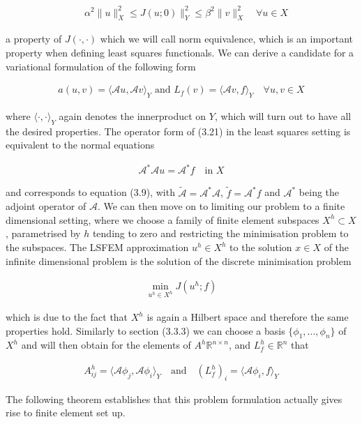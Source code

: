 \documentclass[../draft_1.tex]{subfiles}
\begin{document}
\begin{ceqn}
	\begin{align}
	\quad \alpha^2 \| u \|_X^2 \leq J(u; 0)  \|_Y^2 \leq \beta^2 \| v \|_X^2 \quad \forall u \in X
	\end{align} 
\end{ceqn}
a property of $J(\cdot, \cdot)$ which we will call norm equivalence, which is an important property when defining least squares functionals. We can derive a candidate for a variational formulation of the following form 
\begin{ceqn}
\begin{align}
\label{lsfem_bilinear_form}
a(u,v) = \langle \mathcal{A}u, \mathcal{A}v \rangle_Y \text{ and } L_f(v) = \langle \mathcal{A}v, f \rangle_Y \quad \forall u,v \in X
\end{align}
\end{ceqn}
where $\langle \cdot, \cdot \rangle_Y$ again denotes the innerproduct on $Y$, which will turn out to have all the desired properties. The operator form of (3.21) in the least squares setting is equivalent to the normal equations
\begin{ceqn}
\begin{align}
\mathcal{A}^* \mathcal{A} u = \mathcal{A}^* f \quad \text{in } X
\end{align}
\end{ceqn}
and corresponds to equation (3.9), with $\tilde{\mathcal{A}} = \mathcal{A}^* \mathcal{A}$, $\tilde{f} = \mathcal{A}^* f $ and $\mathcal{A}^*$ being the adjoint operator of $\mathcal{A}$. We can then move on to limiting our problem to a finite dimensional setting, where we choose a family of finite element subspaces $X^h \subset X$, parametrised by $h$ tending to zero and restricting the minimisation problem to the subspaces. The LSFEM approximation $u^h \in X^h$ to the solution $x \in X$ of the infinite dimensional problem is the solution of the discrete minimisation problem 
\begin{ceqn}
\begin{align}
\min_{u^h \in X^h} J(u^h; f)
\end{align}
\end{ceqn}
which is due to the fact that $X^h$ is again a Hilbert space and therefore the same properties hold. Similarly to section (3.3.3) we can choose a basis $\{\phi_1, ..., \phi_n\}$ of $X^h$ and will then obtain for the elements of $A^h \mathbb{R}^{n \times n}$, and $L_f^h \in \mathbb{R}^n$ that

\begin{ceqn}
	\begin{align}
	A_{ij}^h = \langle \mathcal{A} \phi_j, \mathcal{A} \phi_i \rangle_Y \quad \text{and} \quad (L_f^h)_i = \langle \mathcal{A} \phi_i, f \rangle_Y
	\end{align}
\end{ceqn}
The following theorem establishes that this problem formulation actually gives rise to finite element set up. 
\end{document}
